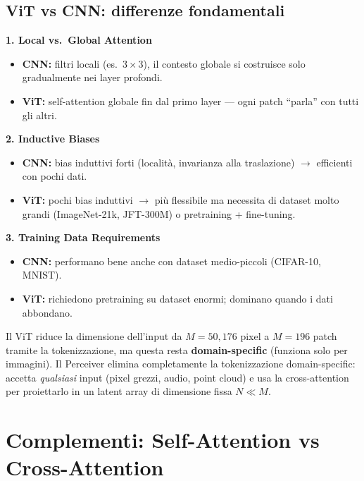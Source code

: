 \documentclass[
  11pt,
]{article}
\begin{document}
\subsection{ViT vs CNN: differenze fondamentali}

\textbf{1. Local vs.\ Global Attention}
\begin{itemize}
\item \textbf{CNN:} filtri locali (es.\ $3 \times 3$), il contesto globale si costruisce solo gradualmente nei layer profondi.
\item \textbf{ViT:} self-attention globale fin dal primo layer --- ogni patch ``parla'' con tutti gli altri.
\end{itemize}

\textbf{2. Inductive Biases}
\begin{itemize}
\item \textbf{CNN:} bias induttivi forti (localit\`a, invarianza alla traslazione) $\to$ efficienti con pochi dati.
\item \textbf{ViT:} pochi bias induttivi $\to$ pi\`u flessibile ma necessita di dataset molto grandi (ImageNet-21k, JFT-300M) o pretraining + fine-tuning.
\end{itemize}

\textbf{3. Training Data Requirements}
\begin{itemize}
\item \textbf{CNN:} performano bene anche con dataset medio-piccoli (CIFAR-10, MNIST).
\item \textbf{ViT:} richiedono pretraining su dataset enormi; dominano quando i dati abbondano.
\end{itemize}

\begin{notabox}[title={\textbf{Collegamento al Perceiver}}]
Il ViT riduce la dimensione dell'input da $M = 50{,}176$ pixel a $M = 196$ patch tramite la tokenizzazione, ma questa resta \textbf{domain-specific} (funziona solo per immagini). Il Perceiver elimina completamente la tokenizzazione domain-specific: accetta \emph{qualsiasi} input (pixel grezzi, audio, point cloud) e usa la cross-attention per proiettarlo in un latent array di dimensione fissa $N \ll M$.
\end{notabox}

\section{Complementi: Self-Attention vs Cross-Attention}
\label{app:self-vs-cross}
\end{document}
